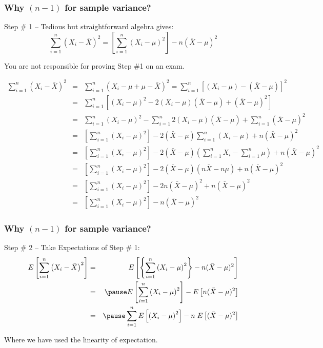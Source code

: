 \begin{frame}
\frametitle{Why $(n-1)$ for sample variance?}
\begin{block}{Step \# 1 -- Tedious but straightforward algebra gives:}
	$$\sum_{i=1}^n \left(X_i - \bar{X}\right)^2 = \left[  \sum_{i=1}^n \left(X_i - \mu\right)^2\right] - n(\bar{X}-\mu)^2$$
\end{block}
\alert{You are not responsible for proving Step \#1 on an exam.}

\end{frame}
\begin{frame}
\scriptsize
\begin{eqnarray*}
	\sum_{i=1}^n \left(X_i - \bar{X}\right)^2 &=& \sum_{i=1}^n \left(X_i - \mu + \mu - \bar{X}\right)^2 = \sum_{i=1}^n \left[(X_i -\mu) - (\bar{X} - \mu)\right]^2\\
		&=&\sum_{i=1}^n \left[(X_i -\mu)^2 - 2(X_i -\mu)(\bar{X} - \mu) + (\bar{X} - \mu)^2\right]\\
		&=&\sum_{i=1}^n (X_i -\mu)^2 - \sum_{i=1}^n 2(X_i -\mu)(\bar{X} - \mu) + \sum_{i=1}^n (\bar{X} - \mu)^2\\
		&=& \left[  \sum_{i=1}^n \left(X_i - \mu\right)^2\right]   - 2(\bar{X} - \mu) \sum_{i=1}^n (X_i -\mu)+n(\bar{X} - \mu)^2\\
				&=& \left[  \sum_{i=1}^n \left(X_i - \mu\right)^2\right]   - 2(\bar{X} - \mu) \left( \sum_{i=1}^n X_i- \sum_{i=1}^n \mu \right)+n(\bar{X} - \mu)^2\\
				&=& \left[  \sum_{i=1}^n \left(X_i - \mu\right)^2\right]   - 2(\bar{X} - \mu)(n\bar{X}-n\mu)+n(\bar{X} - \mu)^2\\
				&=&\left[  \sum_{i=1}^n \left(X_i - \mu\right)^2\right]   - 2n(\bar{X} - \mu)^2+n(\bar{X} - \mu)^2\\
				&=&\left[  \sum_{i=1}^n \left(X_i - \mu\right)^2\right]   - n(\bar{X} - \mu)^2
\end{eqnarray*}
\end{frame}


\begin{frame}
\frametitle{Why $(n-1)$ for sample variance?}
\begin{block}{Step \# 2 -- Take Expectations of Step \# 1:}
	\begin{eqnarray*}
		E\left[\sum_{i=1}^n \left(X_i - \bar{X}\right)^2\right] &=& E\left[\left\{  \sum_{i=1}^n \left(X_i - \mu\right)^2\right\} - n(\bar{X}-\mu)^2\right]\\
			&=&\pause E\left[ \sum_{i=1}^n \left(X_i - \mu\right)^2\right] -E\left[ n(\bar{X}-\mu)^2\right]\\
			&=&\pause  \sum_{i=1}^n E\left[\left(X_i - \mu\right)^2\right] -n\;E\left[ (\bar{X}-\mu)^2\right]\\
	\end{eqnarray*}
\end{block}
\alert{Where we have used the linearity of expectation.}
\end{frame}


